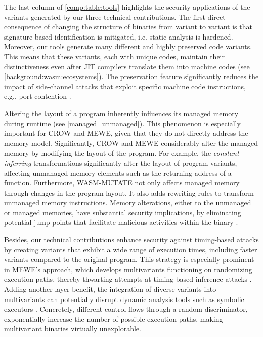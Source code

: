 

The last column of \autoref{comp:table:tools} highlights the security applications of the variants generated by our three technical contributions.
The first direct consequence of changing the structure of \wasm binaries from variant to variant is that signature-based identification is mitigated, i.e. static analysis is hardened.
Moreover, our tools generate many different and highly preserved code variants. 
This means that these variants, each with unique \Wasm codes, maintain their distinctiveness even after JIT compilers translate them into machine codes (see \autoref{background:wasm:ecosystems}). 
The preservation feature significantly reduces the impact of side-channel attacks that exploit specific machine code instructions, e.g., port contention \cite{10.1145/3488932.3517411}.


Altering the layout of a \Wasm program inherently influences its managed memory during runtime (see \autoref{managed_unmanaged}).
This phenomenon is especially important for CROW and MEWE, given that they do not directly address the \Wasm memory model.
Significantly, CROW and MEWE considerably alter the managed memory by modifying the layout of the \Wasm program.
For example, the \emph{constant inferring} transformations significantly alter the layout of program variants, affecting unmanaged memory elements such as the returning address of a function.
Furthermore, WASM-MUTATE not only affects managed memory through changes in the \Wasm program layout.
It also adds rewriting rules to transform unmanaged memory instructions.
Memory alterations, either to the unmanaged or managed memories, have substantial security implications, by eliminating potential jump points that facilitate malicious activities within the binary \cite{Swivel}.


Besides, our technical contributions enhance security against timing-based attacks by creating variants that exhibit a wide range of execution times, including faster variants compared to the original program. 
This strategy is especially prominent in MEWE’s approach, which develops multivariants functioning on randomizing execution paths, thereby thwarting attempts at timing-based inference attacks \cite{DBLP:conf/ndss/SchnitzlerKBP23}. 
Adding another layer benefit, the integration of diverse variants into multivariants can potentially disrupt dynamic analysis tools such as symbolic executors \cite{wasmixer}. 
Concretely, different control flows through a random discriminator, exponentially increase the number of possible execution paths, making multivariant binaries virtually unexplorable.



